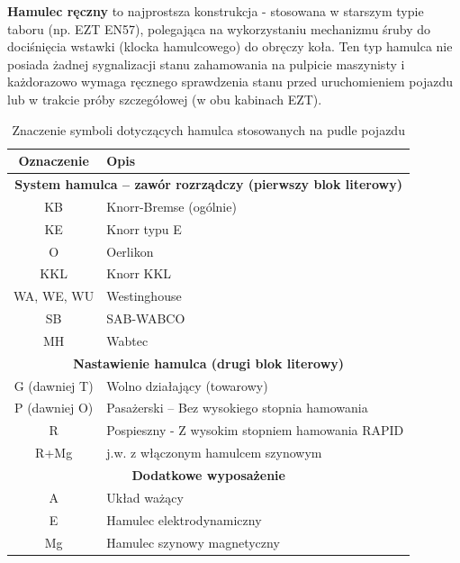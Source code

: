 \textbf{Hamulec ręczny} to najprostsza konstrukcja - stosowana w starszym typie taboru (np. EZT EN57), polegająca na wykorzystaniu mechanizmu śruby do dociśnięcia wstawki (klocka hamulcowego) do obręczy koła. Ten typ hamulca nie posiada żadnej sygnalizacji stanu zahamowania na pulpicie maszynisty i każdorazowo wymaga ręcznego sprawdzenia stanu przed uruchomieniem pojazdu lub w trakcie próby szczegółowej (w obu kabinach EZT).

\begin{table}
	\caption{Znaczenie symboli dotyczących hamulca stosowanych na pudle pojazdu}
	\label{tab:hamulec}
\begin{tabular}{|c|m{8cm}|}
	\hline 
	Oznaczenie&Opis\\ 
	\hline
	\multicolumn{2}{|c|}{\textbf{System hamulca – zawór rozrządczy (pierwszy blok literowy)}} \\
	\hline
	KB & Knorr-Bremse (ogólnie)\\
	\hline
	KE & Knorr typu E\\
	\hline
	O & Oerlikon\\
	\hline
	KKL & Knorr KKL\\
	\hline
	WA, WE, WU & Westinghouse \\
	\hline
	SB & SAB-WABCO\\
	\hline
	MH & Wabtec\\
	\hline
	\multicolumn{2}{|c|}{\textbf{Nastawienie hamulca (drugi blok literowy)}}\\
	\hline
	G (dawniej T) & Wolno działający (towarowy)\\
	\hline
	P (dawniej O) & Pasażerski – Bez wysokiego stopnia hamowania\\
	\hline
	R & Pospieszny - Z wysokim stopniem hamowania RAPID\\
	\hline
	R+Mg & j.w. z włączonym hamulcem szynowym\\
	\hline
	\multicolumn{2}{|c|}{\textbf{Dodatkowe wyposażenie}}\\
	\hline
	A & Układ ważący\\\hline
	E & Hamulec elektrodynamiczny\\
	\hline
	Mg & Hamulec szynowy magnetyczny\\\hline
\end{tabular}
\end{table}

